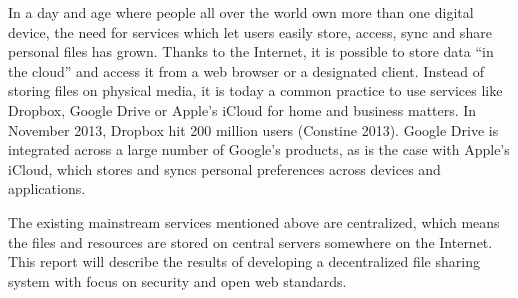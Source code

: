 In a day and age where people all over the world own more than one digital device, the need for services which let users easily store, access, sync and share personal files has grown. Thanks to the Internet, it is possible to store data “in the cloud” and access it from a web browser or a designated client. Instead of storing files on physical media, it is today a common practice to use services like Dropbox, Google Drive or Apple's iCloud for home and business matters. In November 2013, Dropbox hit 200 million users (Constine 2013). Google Drive is integrated across a large number of Google's products, as is the case with Apple's iCloud, which stores and syncs personal preferences across devices and applications.

The existing mainstream services mentioned above are centralized, which means the files and resources are stored on central servers somewhere on the Internet. This report will describe the results of developing a decentralized file sharing system with focus on security and open web standards.







